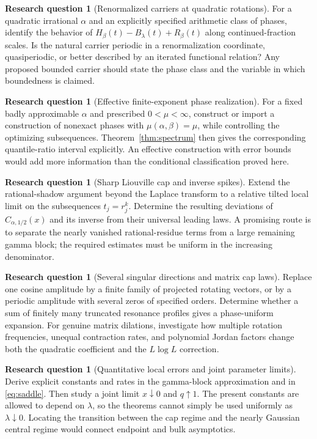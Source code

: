 \documentclass[11pt,a4paper]{article}
\theoremstyle{definition}
\newtheorem{problem}[theorem]{Research question}
\theoremstyle{remark}\newtheorem{remark}[theorem]{Remark}
\begin{document}
\begin{problem}[Renormalized carriers at quadratic rotations]
For a quadratic irrational $\alpha$ and an explicitly specified arithmetic
class of phases, identify the behavior of
$H_\beta(t)-B_\lambda(t)+R_\beta(t)$ along continued-fraction scales.
Is the natural carrier periodic in a renormalization coordinate,
quasiperiodic, or better described by an iterated functional relation?
Any proposed bounded carrier should state the phase class and the variable
in which boundedness is claimed.
\end{problem}

\begin{problem}[Effective finite-exponent phase realization]
For a fixed badly approximable $\alpha$ and prescribed
$0<\mu<\infty$, construct or import a construction of nonexact phases with
$\mu(\alpha,\beta)=\mu$, while controlling the optimizing subsequences.
Theorem~\ref{thm:spectrum} then gives the corresponding quantile-ratio
interval explicitly.  An effective construction with error bounds would add
more information than the conditional classification proved here.
\end{problem}

\begin{problem}[Sharp Liouville cap and inverse spikes]
Extend the rational-shadow argument beyond the Laplace transform to a
relative tilted local limit on the subsequences $t_j=r_j^k$.
Determine the resulting deviations of $C_{\alpha,1/2}(x)$ and its inverse
from their universal leading laws.  A promising route is to separate the
nearly vanished rational-residue terms from a large remaining gamma block;
the required estimates must be uniform in the increasing denominator.
\end{problem}

\begin{problem}[Several singular directions and matrix cap laws]
Replace one cosine amplitude by a finite family of projected rotating
vectors, or by a periodic amplitude with several zeros of specified orders.
Determine whether a sum of finitely many truncated resonance profiles gives
a phase-uniform expansion.  For genuine matrix dilations, investigate how
multiple rotation frequencies, unequal contraction rates, and polynomial
Jordan factors change both the quadratic coefficient and the
$L\log L$ correction.
\end{problem}

\begin{problem}[Quantitative local errors and joint parameter limits]
Derive explicit constants and rates in the gamma-block approximation and in
\eqref{eq:saddle}.  Then study a joint limit $x\downarrow0$ and $q\uparrow1$.
The present constants are allowed to depend on $\lambda$, so the theorems
cannot simply be used uniformly as $\lambda\downarrow0$.  Locating the
transition between the cap regime and the nearly Gaussian central regime
would connect endpoint and bulk asymptotics.
\end{problem}
\end{document}
